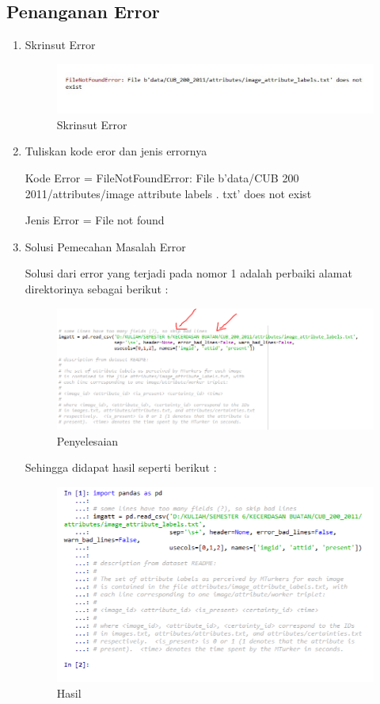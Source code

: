 \subsection{Penanganan Error}
\begin{enumerate}
\item Skrinsut Error
	\begin{figure}[ht]
	\centering
	\includegraphics[scale=0.5]{figures/AIP/ai37.PNG}
	\caption{Skrinsut Error}
	\label{contoh}
	\end{figure}
\item Tuliskan kode eror dan jenis errornya
	\par Kode Error = FileNotFoundError: File b'data/CUB 200 2011/attributes/image attribute labels . txt' does not exist
	\par Jenis Error = File not found
\item Solusi Pemecahan Masalah Error
\par Solusi dari error yang terjadi pada nomor 1 adalah perbaiki alamat direktorinya sebagai berikut :
	\begin{figure}[ht]
	\centering
	\includegraphics[scale=0.5]{figures/AIP/ai38.PNG}
	\caption{Penyelesaian}
	\label{contoh}
	\end{figure}
\par Sehingga didapat hasil seperti berikut :
	\begin{figure}[ht]
	\centering
	\includegraphics[scale=0.5]{figures/AIP/ai39.PNG}
	\caption{Hasil}
	\label{contoh}
	\end{figure}
\end{enumerate}

